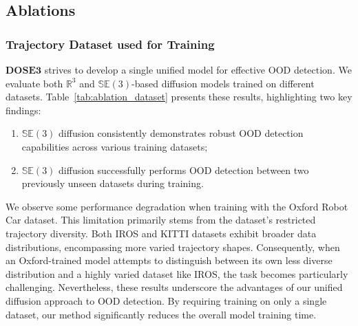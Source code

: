 \subsection{Ablations}
\subsubsection{Trajectory Dataset used for Training}
$\mathbf{DOSE3}$ strives to develop a single unified model for effective OOD detection. We evaluate both $\mathbb{R}^3$ and $\mathbb{SE}(3)$-based diffusion models trained on different datasets. Table~\ref{tab:ablation_dataset} presents these results, highlighting two key findings:
\begin{enumerate}
\item $\mathbb{SE}(3)$ diffusion consistently demonstrates robust \ac{OOD} detection capabilities across various training datasets;
\item $\mathbb{SE}(3)$ diffusion successfully performs \ac{OOD} detection between two previously unseen datasets during training.
\end{enumerate}
We observe some performance degradation when training with the Oxford Robot Car dataset. This limitation primarily stems from the dataset's restricted trajectory diversity. Both IROS and KITTI datasets exhibit broader data distributions, encompassing more varied trajectory shapes. Consequently, when an Oxford-trained model attempts to distinguish between its own less diverse distribution and a highly varied dataset like IROS, the task becomes particularly challenging. Nevertheless, these results underscore the advantages of our unified diffusion approach to OOD detection. By requiring training on only a single dataset, our method significantly reduces the overall model training time.
